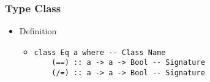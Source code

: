 \subsubsection{Type Class}
\begin{itemize}
    \item Definition
        \begin{itemize}
             upper-case
             Function names with their type
                \begin{itemize}
                    \item Required to be implemented by instances of this type
                \end{itemize}
             Definition based on other signatures
                \begin{itemize}
                    \item Optional
                    \item Can be overwritten
                \end{itemize}
            \item 
\begin{verbatim}
class Eq a where -- Class Name
    (==) :: a -> a -> Bool -- Signature
    (/=) :: a -> a -> Bool -- Signature


\end{verbatim}
\end{itemize}
\end{itemize}
